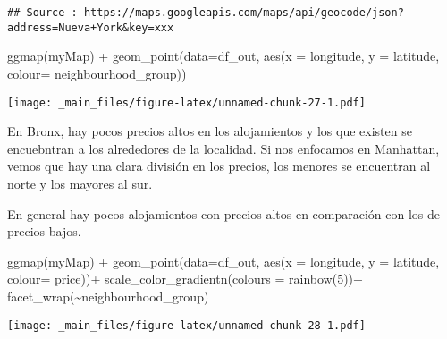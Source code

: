 \documentclass[
]{book}
\newenvironment{Shaded}{\begin{snugshade}}{\end{snugshade}}
\newcommand{\AttributeTok}[1]{\textcolor[rgb]{0.77,0.63,0.00}{#1}}
\newcommand{\DecValTok}[1]{\textcolor[rgb]{0.00,0.00,0.81}{#1}}
\newcommand{\FunctionTok}[1]{\textcolor[rgb]{0.00,0.00,0.00}{#1}}
\newcommand{\NormalTok}[1]{#1}
\newcommand{\SpecialCharTok}[1]{\textcolor[rgb]{0.00,0.00,0.00}{#1}}
\begin{document}
\begin{verbatim}
## Source : https://maps.googleapis.com/maps/api/geocode/json?address=Nueva+York&key=xxx
\end{verbatim}

\begin{Shaded}
\begin{Highlighting}[]
\FunctionTok{ggmap}\NormalTok{(myMap) }\SpecialCharTok{+} \FunctionTok{geom\_point}\NormalTok{(}\AttributeTok{data=}\NormalTok{df\_out, }\FunctionTok{aes}\NormalTok{(}\AttributeTok{x =}\NormalTok{ longitude, }\AttributeTok{y =}\NormalTok{ latitude, }\AttributeTok{colour=}\NormalTok{ neighbourhood\_group))}
\end{Highlighting}
\end{Shaded}

\texttt{[image: \_main\_files/figure-latex/unnamed-chunk-27-1.pdf]}

En Bronx, hay pocos precios altos en los alojamientos y los que existen se encuebntran a los alrededores de la localidad. Si nos enfocamos en Manhattan, vemos que hay una clara división en los precios, los menores se encuentran al norte y los mayores al sur.

En general hay pocos alojamientos con precios altos en comparación con los de precios bajos.

\begin{Shaded}
\begin{Highlighting}[]
\FunctionTok{ggmap}\NormalTok{(myMap) }\SpecialCharTok{+} 
  \FunctionTok{geom\_point}\NormalTok{(}\AttributeTok{data=}\NormalTok{df\_out, }\FunctionTok{aes}\NormalTok{(}\AttributeTok{x =}\NormalTok{ longitude, }\AttributeTok{y =}\NormalTok{ latitude, }\AttributeTok{colour=}\NormalTok{ price))}\SpecialCharTok{+}
  \FunctionTok{scale\_color\_gradientn}\NormalTok{(}\AttributeTok{colours =} \FunctionTok{rainbow}\NormalTok{(}\DecValTok{5}\NormalTok{))}\SpecialCharTok{+}
  \FunctionTok{facet\_wrap}\NormalTok{(}\SpecialCharTok{\textasciitilde{}}\NormalTok{neighbourhood\_group)}
\end{Highlighting}
\end{Shaded}

\texttt{[image: \_main\_files/figure-latex/unnamed-chunk-28-1.pdf]}

  
\end{document}
